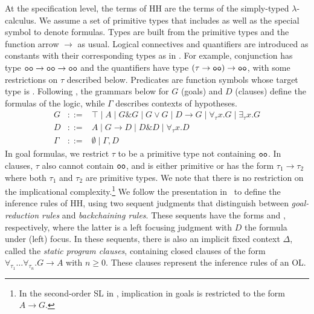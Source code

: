 
At the specification level, the terms of HH are the terms of the
simply-typed $\lambda$-calculus. We assume a set of primitive types
that includes  as well as the special symbol  to
denote formulas.  Types are built from the primitive types and the
function arrow $\rightarrow$ as usual.  Logical connectives and
quantifiers are introduced as constants with their corresponding types
as in \cite{Church40}.  For example, conjunction has type
$\texttt{oo}\rightarrow \texttt{oo}\rightarrow \texttt{oo}$ and the
quantifiers have type $(\tau\rightarrow \texttt{oo})\rightarrow
\texttt{oo}$, with some restrictions on $\tau$ described below.
Predicates are function symbols whose target type is .
Following \cite{LProlog}, the grammars below for $G$ (goals) and $D$
(clauses) define the formulas of the logic, while $\Gamma$ describes
contexts of hypotheses.
$$\begin{array}{rcl}
G & ::= &
 \top \mathrel{|}
 A \mathrel{|}
 G\mathrel{\&}G \mathrel{|}
 G \lor G \mathrel{|}
 D\longrightarrow G \mathrel{|}
 \forall_\tau x. G \mathrel{|}
 \exists_\tau x. G
\\
D & ::= &
 A \mathrel{|}
 G\longrightarrow D \mathrel{|}
 D \mathrel{\&} D \mathrel{|}
 \forall_\tau x. D
\\
\Gamma & ::= &
 \emptyset \mathrel{|} \Gamma,D
\end{array}$$
In goal formulas, we restrict $\tau$ to be a primitive type not
containing $\texttt{oo}$.  In clauses, $\tau$ also cannot contain
$\texttt{oo}$, and is either primitive or has the form
$\tau_1\rightarrow\tau_2$ where both $\tau_1$ and $\tau_2$ are
primitive types.
We note that there is no restriction on the implicational
complexity.\footnote{In the second-order SL in
  \cite{FeltyMomigliano:JAR10}, implication in goals is restricted to
  the form $A\longrightarrow G$.}
%
We follow the presentation in~\cite{WCGN:PPDP13} to define the
inference rules of HH, using two sequent judgments that distinguish
between \emph{goal-reduction rules} and \emph{backchaining rules}.
These sequents have the forms  and ,
respectively, where the latter is a left focusing judgment with $D$
the formula under (left) focus.  In these sequents, there is also an
implicit fixed context $\Delta$, called the \emph{static program
  clauses}, containing closed clauses of the form
$\forall_{\tau_1}\ldots\forall_{\tau_n}.G\longrightarrow A$ with
$n\ge0$. %
%
These clauses represent the inference rules of an OL.

